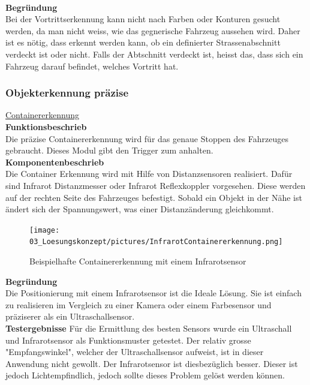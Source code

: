\\[0.2cm]
\textbf{Begründung}\\
Bei der Vortrittserkennung kann nicht nach Farben oder Konturen gesucht werden, da man nicht weiss, wie das gegnerische Fahrzeug aussehen wird. Daher ist es nötig, dass erkennt werden kann, ob ein definierter Strassenabschnitt verdeckt ist oder nicht. Falls der Abtschnitt verdeckt ist, heisst das, dass sich ein Fahrzeug darauf befindet, welches Vortritt hat.
\subsubsection{Objekterkennung präzise}
\underline{Containererkennung}\\[0.2cm]
\textbf{Funktionsbeschrieb}\\[0.2cm]
Die präzise Containererkennung wird für das genaue Stoppen des Fahrzeuges gebraucht. Dieses Modul gibt den Trigger zum anhalten.\\[0.2cm]
\textbf{Komponentenbeschrieb}\\[0.2cm]
Die Container Erkennung wird mit Hilfe von Distanzsensoren realisiert. Dafür sind Infrarot Distanzmesser oder Infrarot Reflexkoppler vorgesehen. Diese werden auf der rechten Seite des Fahrzeuges befestigt. Sobald ein Objekt in der Nähe ist ändert sich der Spannungswert, was einer Distanzänderung gleichkommt. 
\begin{figure} [H]
	\centering
	\texttt{[image: 03\_Loesungskonzept/pictures/InfrarotContainererkennung.png]}
	\caption{Beispielhafte Containererkennung mit einem Infrarotsensor}
\end{figure}
\textbf{Begründung}\\[0.2cm]
Die Positionierung mit einem Infrarotsensor ist die Ideale Lösung. Sie ist einfach zu realisieren im Vergleich zu einer Kamera oder einem Farbesensor und präziserer als ein Ultraschallsensor.\\[0.2cm]
\textbf{Testergebnisse}
Für die Ermittlung des besten Sensors wurde ein Ultraschall und Infrarotsensor als Funktionsmuster getestet. Der relativ grosse "Empfangswinkel", welcher der Ultraschallsensor aufweist, ist in dieser Anwendung nicht gewollt. Der Infrarotsensor ist diesbezüglich besser. Dieser ist jedoch Lichtempfindlich, jedoch sollte dieses Problem gelöst werden können.\\[0.2cm]

